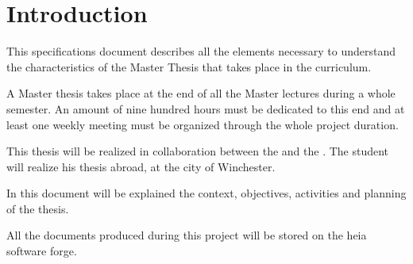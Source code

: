 \chapter{Introduction}
\label{chap:introduction}

This specifications document describes all the elements necessary to understand the characteristics of the Master Thesis that takes place in the  curriculum.

A Master thesis takes place at the end of all the Master lectures during a whole semester. An amount of nine hundred hours must be dedicated to this end and at least one weekly meeting must be organized through the whole project duration.

This thesis will be realized in collaboration between the  and the . The student will realize his thesis abroad, at the city of Winchester.

In this document will be explained the context, objectives, activities and planning of the thesis.

All the documents produced during this project will be stored on the \gls{heia} software forge\cite{website:gitlab}.